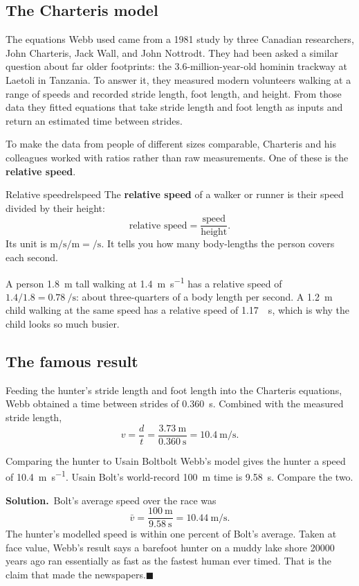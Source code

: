 \documentclass[11pt,twoside,openany]{book}
\newcommand{\solution}{\par\smallskip\noindent\textbf{Solution.}\ }
\newcommand{\qed}{\hfill$\blacksquare$}
\begin{document}
\subsection{The Charteris model}

The equations Webb used came from a 1981 study by three Canadian researchers, John Charteris, Jack Wall, and John Nottrodt. They had been asked a similar question about far older footprints: the 3.6-million-year-old hominin trackway at Laetoli in Tanzania. To answer it, they measured modern volunteers walking at a range of speeds and recorded stride length, foot length, and height. From those data they fitted equations that take stride length and foot length as inputs and return an estimated time between strides.

To make the data from people of different sizes comparable, Charteris and his colleagues worked with ratios rather than raw measurements. One of these is the \textbf{relative speed}.

\begin{definition}{Relative speed}{relspeed}
The \textbf{relative speed} of a walker or runner is their speed divided by their height:
\[
\text{relative speed} = \frac{\text{speed}}{\text{height}}.
\]
Its unit is $\si{\metre\per\second}/\si{\metre} = \si{\per\second}$. It tells you how many body-lengths the person covers each second.
\end{definition}

A person \SI{1.8}{\metre} tall walking at \SI{1.4}{\metre\per\second} has a relative speed of $1.4/1.8 = \SI{0.78}{\per\second}$: about three-quarters of a body length per second. A \SI{1.2}{\metre} child walking at the same speed has a relative speed of \SI{1.17}{\per\second}, which is why the child looks so much busier.

\subsection{The famous result}

Feeding the hunter's stride length and foot length into the Charteris equations, Webb obtained a time between strides of \SI{0.360}{\second}. Combined with the measured stride length,
\[
v = \frac{d}{t} = \frac{\SI{3.73}{\metre}}{\SI{0.360}{\second}} = \SI{10.4}{\metre\per\second}.
\]

\begin{example}{Comparing the hunter to Usain Bolt}{bolt}
Webb's model gives the hunter a speed of \SI{10.4}{\metre\per\second}. Usain Bolt's world-record \SI{100}{\metre} time is \SI{9.58}{\second}. Compare the two.

\solution Bolt's average speed over the race was
\[
\bar v = \frac{\SI{100}{\metre}}{\SI{9.58}{\second}} = \SI{10.44}{\metre\per\second}.
\]
The hunter's modelled speed is within one percent of Bolt's average. Taken at face value, Webb's result says a barefoot hunter on a muddy lake shore \num{20000} years ago ran essentially as fast as the fastest human ever timed. That is the claim that made the newspapers.\qed
\end{example}
\end{document}
